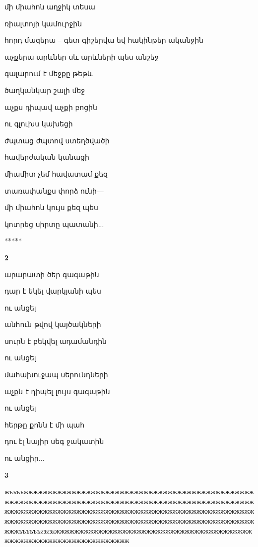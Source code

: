 մի միահոն աղջիկ տեսա

ռիալտոյի  կամուրջին

հորդ մազերա --  գետ գիշերվա
եվ   հակինթեր ականջին

աչքերա    արևներ սև
արևների պես անշեջ


 գալարում է մեջքը թեթև


ծաղկանկար շալի   մեջ

  աչքս  դիպավ  աչքի բոցին

  ու գլուխս  կախեցի

 ժպտաց  ժպտով ստեղծվածի

  հավերժական կանացի



միամիտ չեմ հավատամ քեզ
     

 տառափանքս փորձ ունի---


մի միահոն կույս քեզ պես  


կոտրեց սիրտը պատանի...
                          



\centerline  {*****}

\centerline{\bf 2}



 արարատի ծեր  գագաթին 

 դար է եկել վարկյանի պես  


 ու անցել


 անհուն թվով կայծակների

 սուրն է բեկվել  ադամանդին 

 ու անցել




 մահախուջապ սերունդների

 աչքն է դիպել լույս գագաթին


 ու անցել



 հերթը քոնն է մի պահ 


 դու էլ նայիր սեգ ջակատին


 ու անցիր...



\centerline  {\bf  3}\foonote
                                                                                                                                                                                           
жъъъъжжжжжжжжжжжжжжжжжжжжжжжжжжжжжжжжжжжжжжжжжжжжжжжжжжжжжжжжжжжжжжжжжжжжжжжжжжжжжжжжжжжжжжжжжжжжжжжжжжжжжжжжжжжжжжжжжжжжжжжжжжжжжжжжжжжжжжжжжжжжжжжжжжжжжжжжжжжжжжжжжжжжжжжжжжжжжжжжжжжжжжжжжжжжжжжжжжжжжжжжжжжжжжжъъъъъъzзzзzжжжжжжжжжжжжжжжжжжжжжжжжжжжжжжжжжжжжжжжжжжжжжжжжжжжжжжжжжжжжжжжжжжж

